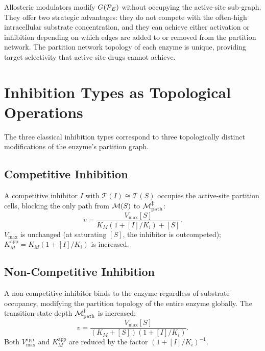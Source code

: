 \begin{remark}
Allosteric modulators modify $G(\mathcal{P}_E)$ without occupying the active-site
sub-graph. They offer two strategic advantages: they do not compete with the
often-high intracellular substrate concentration, and they can achieve
either activation or inhibition depending on which edges are added to or
removed from the partition network. The partition network topology of
each enzyme is unique, providing target selectivity that active-site drugs
cannot achieve.
\end{remark}

\section{Inhibition Types as Topological Operations}
\label{sec:inhibition_types}

The three classical inhibition types correspond to three topologically
distinct modifications of the enzyme's partition graph.

\subsection{Competitive Inhibition}
\label{ssec:competitive}

A competitive inhibitor $I$ with $\mathcal{T}(I) \cong \mathcal{T}(S)$
occupies the active-site partition cells, blocking the only path from
$\mathcal{M}(S)$ to $\mathcal{M}_{\mathrm{path}}^\ddagger$:
\begin{equation}
  v = \frac{V_{\max}[S]}{K_M(1 + [I]/K_i) + [S]}.
  \label{eq:competitive}
\end{equation}
$V_{\max}$ is unchanged (at saturating $[S]$, the inhibitor is outcompeted);
$K_M^{\mathrm{app}} = K_M(1 + [I]/K_i)$ is increased.

\subsection{Non-Competitive Inhibition}
\label{ssec:noncompetitive}

A non-competitive inhibitor binds to the enzyme regardless of substrate
occupancy, modifying the partition topology of the entire enzyme globally.
The transition-state depth $\mathcal{M}_{\mathrm{path}}^\ddagger$ is increased:
\begin{equation}
  v = \frac{V_{\max}[S]}{(K_M + [S])(1 + [I]/K_i)}.
  \label{eq:noncompetitive}
\end{equation}
Both $V_{\max}^{\mathrm{app}}$ and $K_M^{\mathrm{app}}$ are reduced by
the factor $(1 + [I]/K_i)^{-1}$.

